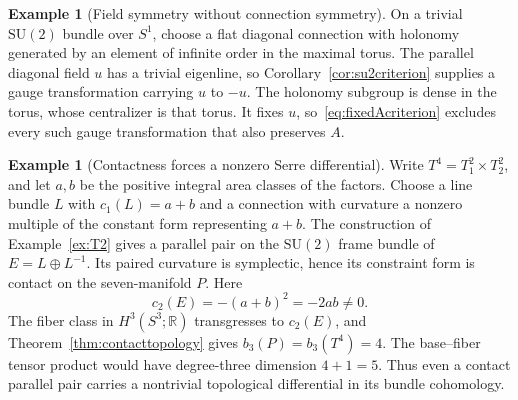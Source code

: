 \documentclass[11pt]{amsart}
\newcommand{\R}{\mathbb R}
\theoremstyle{plain}
\theoremstyle{definition}
\newtheorem{example}[theorem]{Example}
\theoremstyle{remark}
\begin{document}
\begin{example}[Field symmetry without connection symmetry]
On a trivial $\mathrm{SU}(2)$ bundle over $S^1$, choose a flat diagonal connection with holonomy generated by an element of infinite order in the maximal torus.  The parallel diagonal field $u$ has a trivial eigenline, so Corollary~\ref{cor:su2criterion} supplies a gauge transformation carrying $u$ to $-u$.  The holonomy subgroup is dense in the torus, whose centralizer is that torus.  It fixes $u$, so~\eqref{eq:fixedAcriterion} excludes every such gauge transformation that also preserves $A$.
\end{example}

\begin{example}[Contactness forces a nonzero Serre differential]\label{ex:T4}
Write $T^4=T^2_1\times T^2_2$, and let $a,b$ be the positive integral area classes of the factors.  Choose a line bundle $L$ with $c_1(L)=a+b$ and a connection with curvature a nonzero multiple of the constant form representing $a+b$.  The construction of Example~\ref{ex:T2} gives a parallel pair on the $\mathrm{SU}(2)$ frame bundle of $E=L\oplus L^{-1}$.  Its paired curvature is symplectic, hence its constraint form is contact on the seven-manifold $P$.  Here
\[
 c_2(E)=-(a+b)^2=-2ab\ne0.
\]
The fiber class in $H^3(S^3;\R)$ transgresses to $c_2(E)$, and Theorem~\ref{thm:contacttopology} gives $b_3(P)=b_3(T^4)=4$.  The base--fiber tensor product would have degree-three dimension $4+1=5$.  Thus even a contact parallel pair carries a nontrivial topological differential in its bundle cohomology.
\end{example}
\end{document}
